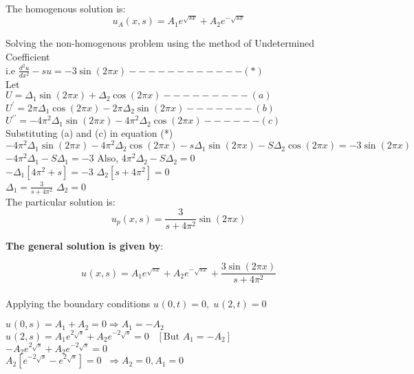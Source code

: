 \documentclass[a4paper 11pt]{article}
\newcommand{\sbracket}[1]{\left[#1\right]}
\newcommand{\Un}[2]{u_{#1}(#2)}
\newcommand{\NI}{\noindent}
\newcommand{\Dtl}[1]{\Delta_{#1}}
\begin{document}
\NI The homogenous solution is: \\[0.2cm]
$$\Un{A}{x,s} = A_{1}e^{\sqrt{sx}} + A_{2}e^{-\sqrt{sx}}$$

\NI Solving the non-homogenous problem using the method of Undetermined Coefficient \\[0.2cm]
i.e ${\displaystyle \frac{d^{2}u}{dx^{2}} - su = - 3\sin(2\pi x) - - - - - - - - - - - - (*)}$ \\[0.2cm]
Let \\ ${\displaystyle U = \Delta_{1}\sin(2\pi x) + \Delta_{2}\cos(2\pi x) - - - - - - - - - (a)}$ \\[0.2cm]
 ${\displaystyle U^{\prime} = 2\pi \Delta_{1}\cos(2\pi x) - 2\pi \Delta_{2}\sin(2\pi x)  - - - - - - - (b)}$ \\[0.2cm]
 ${\displaystyle U^{\prime\prime} = -4\pi^{2} \Delta_{1}\sin(2\pi x) - 4\pi^2\Delta_2\cos(2\pi x)  - - - - - - (c)}$ \\[0.2cm]

\NI Substituting (a) and (c) in equation (*) \\[0.2cm]
$-4\pi^{2}\Dtl{1}\sin(2\pi x) - 4\pi^{2}\Dtl{2}\cos(2\pi x) - s\Dtl{1}\sin(2\pi x) - S\Dtl{2}\cos(2\pi x) = -3\sin(2\pi x)$ \\[0.2cm]
$-4\pi^{2}\Dtl{1} - S\Dtl{1} = - 3$  \quad \quad \quad Also, $4\pi^{2}\Dtl{2} - S\Dtl{2} = 0$ \\[0.2cm]
$-\Dtl{1}\sbracket{4\pi^{2} + s} = - 3 $ \quad \quad \quad \quad \quad \quad $\Dtl{2}\sbracket{s + 4\pi^{2}} = 0$ \\[0.2cm]
$\Dtl{1} = \displaystyle \frac{3}{s + 4\pi^{2}} $ \quad \quad \quad \quad \quad \quad \quad  \quad \quad $\Dtl{2} = 0$ \\[0.2cm]

\NI The particular solution is:\\
$$\Un{p}{x,s} = \frac{3}{s + 4\pi^{2}}\sin(2\pi x) $$

\NI  \textbf{The general solution is given by}:

$$\Un{}{x,s} = A_{1}e^{\sqrt{sx}} + A_{2}e^{-\sqrt{sx}} + \frac{3\sin(2\pi x)}{s + 4\pi^{2}}$$ \\[0.5cm]

\NI Applying the boundary conditions $\Un{}{0,t} = 0, \; \Un{}{2,t} = 0$

\NI $\displaystyle \Un{}{0,s} = A_1 + A_2 = 0 \Rightarrow A_1 = - A_2$\\[0.2cm]
\NI $\displaystyle \Un{}{2,s} = A_{1}e^{2\sqrt{s}} + A_{2}e^{-2\sqrt{s}} = 0 \; \; \; \sbracket{\text{But } A_1 = - A_2}$\\[0.2cm]
$\displaystyle - A_2e^{2\sqrt{s}} + A_2e^{-2\sqrt{s}} = 0$\\[0.2cm]
$\displaystyle A_{2}\sbracket{e^{-2\sqrt{s}} - e^{2\sqrt{s}}} = 0 \; \; \Rightarrow A_2 = 0, A_1 = 0$\\[0.2cm]
\end{document}
